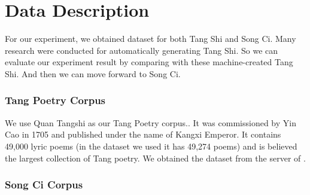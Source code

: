 \section{Data Description}   
For our experiment, we obtained dataset for both Tang Shi and Song Ci. Many research were conducted for automatically generating Tang Shi. So we can evaluate our experiment result by comparing with these machine-created Tang Shi. And then we can move forward to Song Ci.
\subsubsection{Tang Poetry Corpus}
We use Quan Tangshi as our Tang Poetry corpus.\cite{1960quantangshi}. It was commissioned by Yin Cao in 1705 and published under the name of Kangxi Emperor. It contains 49,000 lyric poems (in the dataset we used it has 49,274 poems) and is believed the largest collection of Tang poetry. We obtained the dataset from the server of \cite{zhang2014chinese}.
\subsubsection{Song Ci Corpus}